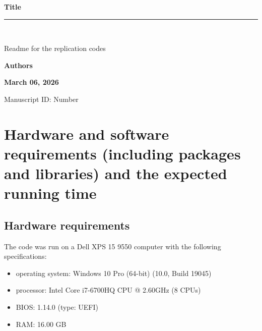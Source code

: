 \documentclass{article}
\begin{document}
	
	\begin{titlepage}
		\centering
		\vspace*{2cm}
		
		{\LARGE \textbf{Title\\
				\vspace*{0.25cm}
				 }}
		
		\vspace{0.5cm}
		
		\rule{0.8\textwidth}{0.4pt}\\
		
		\vspace{0.5cm}
		
		\begin{center}
			{\large {Readme for the replication codes}}
		\end{center}
		
		\vspace{0.5cm}
		
		\textbf{Authors}
		
		\vspace{1.5cm}
		
		\textbf{March 06, 2026}\\
		
		\vfill
		
		
		
		\vspace{0.8cm}
		
		Manuscript ID: Number\\
		
	\end{titlepage}
	
	\section{Hardware and software requirements (including packages and libraries) and the expected running time}
	
	\subsection{Hardware requirements}
	The code was run on a Dell XPS 15 9550 computer with the following specifications:
	
	\begin{itemize}
		\item operating system: Windows 10 Pro (64-bit) (10.0, Build 19045)
		\item processor: Intel Core i7-6700HQ CPU @ 2.60GHz (8 CPUs)
		\item BIOS: 1.14.0 (type: UEFI)
		\item RAM: 16.00 GB
	\end{itemize}
	
\end{document}
